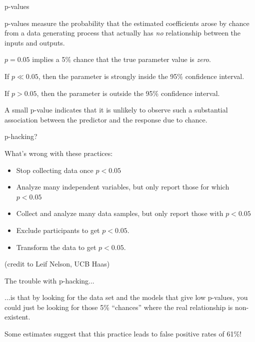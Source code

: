 \documentclass[aspectratio=169]{beamer}
\begin{document}
\begin{frame}{p-values}

p-values measure the probability that the estimated coefficients arose by chance from a data generating process that actually has \textit{no} relationship between the inputs and outputs.  

\vspace{5mm}

$p = 0.05$ implies a 5\% chance that the true parameter value is \textit{zero}.  

\vspace{5mm}

If $p\ll0.05$, then the parameter is strongly inside the 95\% confidence interval.

\vspace{5mm}

If $p>0.05$, then the parameter is outside the 95\% confidence interval.

\vspace{5mm}

A small p-value indicates that it is unlikely to observe such a substantial association between the predictor and the response due to chance.

\end{frame}

\begin{frame}{p-hacking?}

What's wrong with these practices:
\begin{itemize}
  \item Stop collecting data once $p<0.05$
  \item Analyze many independent variables, but only report those for which $p<0.05$
  \item Collect and analyze many data samples, but only report those with $p<0.05$
  \item Exclude participants to get  $p<0.05$.
  \item Transform the data to get  $p<0.05$.
\end{itemize}

(credit to Leif Nelson, UCB Haas)

\end{frame}

\begin{frame}{The trouble with p-hacking...}

...is that by looking for the data set and the models that give low p-values, you could just be looking for those 5\% ``chances'' where the real relationship is non-existent.

\vspace{5mm}\pause

Some estimates suggest that this practice leads to false positive rates of 61\%!

\end{frame}
\end{document}
